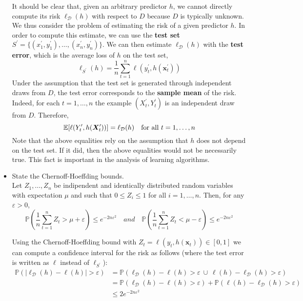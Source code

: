 \begin{itemize}
        It should be clear that, given an arbitrary predictor $h$, we cannot directly compute its risk $\ell_{\mathcal{D}}(h)$ with respect to $D$ because $D$ is typically unknown.
        We thus consider the problem of estimating the risk of a given predictor $h$. In order to compute this estimate, we can use the \textbf{test set} $S^\prime = \{(x^\prime_{1} , y^\prime_{1}), \dots , (x^\prime_{n}, y^\prime_{n})\}$. We can then estimate $\ell_{\mathcal{D}}(h)$ with the \textbf{test error}, which is the average loss of $h$ on the test set,
        $$
        \ell_{S^\prime}(h) = \frac{1}{n}\sum_{t=1}^{n} \ell(y^\prime_{t}, h(\boldsymbol{x}^\prime_{t}))
        $$
        Under the assumption that the test set is generated through independent draws from $D$, the test error corresponds to the \textbf{sample mean} of the risk. Indeed, for each $t = 1, \dots, n$ the example $(X^\prime_{t} , Y^\prime_{t})$ is an independent draw from $D$. Therefore,
        $$
        \mathbb{E}[\ell(Y^\prime_{t}, h(\boldsymbol{X}^\prime_{t}))] = \ell_{\mathcal{D}}(h) \quad \textmd{for all}\ t = 1, \dots, n
        $$
        Note that the above equalities rely on the assumption that $h$ does not depend on the test set. If it did, then the above equalities would not be necessarily true. This fact is important in the analysis of learning algorithms.

    
    \item State the Chernoff-Hoeffding bounds.\\

        Let $Z_1, \dots, Z_n$ be indipendent and identically distributed random variables with expectation $\mu$ and such that $0 \leq Z_i \leq 1$ for all $i = 1, \dots, n$. Then, for any $\varepsilon > 0$,
        $$
        \mathbb{P}\left(\frac{1}{n}\sum_{t=1}^{n} Z_t > \mu + \varepsilon\right) \leq e^{-2n\varepsilon^{2}}
        \quad and \quad
        \mathbb{P}\left(\frac{1}{n}\sum_{t=1}^{n} Z_t < \mu - \varepsilon\right) \leq e^{-2n\varepsilon^{2}}
        $$

        Using the Chernoff-Hoeffding bound with $Z_t = \ell(y_t, h(\boldsymbol{x}_t)) \in [0, 1]$ we can compute a confidence interval for the risk as follows (where the test error is written as $\ell$ instead of $\ell_{S^\prime}$):
        \begin{equation} 
            \begin{split}
                \mathbb{P}\left(|\ell_{\mathcal{D}}(h) - \ell(h)| > \varepsilon\right) & = \mathbb{P}\left(\ell_{\mathcal{D}}(h) - \ell(h) > \varepsilon\ \cup\ \ell(h) - \ell_{\mathcal{D}}(h) > \varepsilon\right)\\ 
                                                                                    & = \mathbb{P}\left(\ell_{\mathcal{D}}(h) - \ell(h) > \varepsilon\right) + \mathbb{P}\left(\ell(h) - \ell_{\mathcal{D}}(h) > \varepsilon\right)\\ 
                                                                                    & \leq 2e^{-2n\varepsilon^{2}}\\
            \end{split}
        \end{equation}


\end{itemize}
